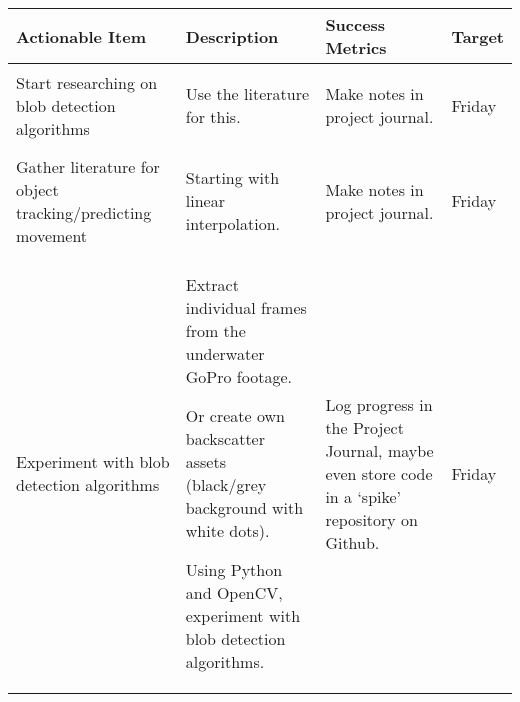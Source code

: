 \begin{table}[!h]
    \centering
    \begin{tabularx}{\textwidth}{|X|X|X|l|}
        \hline
        Actionable Item & Description & Success Metrics & Target \\
        \hline
        \hline
        Start researching on blob detection algorithms &
        \begin{myitemize}
            \item Use the literature for this.
        \end{myitemize} &
        \begin{myitemize}
            \item Make notes in project journal.
        \end{myitemize} &
        Friday \\
        \hline
        Gather literature for object tracking/predicting movement &
        \begin{myitemize}
            \item Starting with linear interpolation.
        \end{myitemize} &
        \begin{myitemize}
            \item Make notes in project journal.
        \end{myitemize} &
        Friday \\
        \hline
        Experiment with blob detection algorithms &
        \begin{myitemize}
            \item Extract individual frames from the underwater GoPro footage.
            \item Or create own backscatter assets (black/grey background with white dots).
            \item Using Python and OpenCV, experiment with blob detection algorithms.
        \end{myitemize} &
        \begin{myitemize}
            \item Log progress in the Project Journal, maybe even store code in a `spike' repository on Github.
        \end{myitemize} &
        Friday \\
        \hline
    \end{tabularx}
\end{table}
